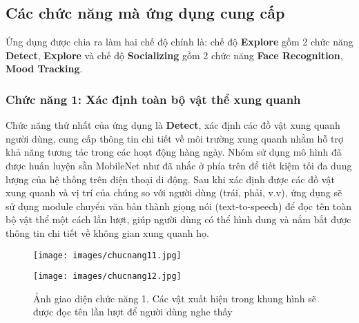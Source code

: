 \documentclass[a4paper,12pt]{article}
\begin{document}
\subsection{Các chức năng mà ứng dụng cung cấp}
Ứng dụng được chia ra làm hai chế độ chính là: chế độ \textbf{Explore} gồm 2 chức năng \textbf{Detect}, \textbf{Explore} và chế độ \textbf{Socializing} gồm 2 chức năng \textbf{Face Recognition}, \textbf{Mood Tracking}.

\subsubsection{Chức năng 1: Xác định toàn bộ vật thể xung quanh}
Chức năng thứ nhất của ứng dụng là \textbf{Detect}, xác định các đồ vật xung quanh người dùng, cung cấp thông tin chi tiết về môi trường xung quanh nhằm hỗ trợ khả năng tương tác trong các hoạt động hàng ngày. Nhóm sử dụng mô hình đã được huấn luyện sẵn MobileNet như đã nhắc ở phía trên để tiết kiệm tối đa dung lượng của hệ thống trên điện thoại di động. Sau khi xác định được các đồ vật xung quanh và vị trí của chúng so với người dùng (trái, phải, v.v), ứng dụng sẽ sử dụng module chuyển văn bản thành giọng nói (text-to-speech) để đọc tên toàn bộ vật thể một cách lần lượt, giúp người dùng có thể hình dung và nắm bắt được thông tin chi tiết về không gian xung quanh họ.
\begin{figure}[H]
    \centering
    \begin{minipage}{0.49\textwidth}
        \centering
        \texttt{[image: images/chucnang11.jpg]}
    \end{minipage}
    \hfill
    \begin{minipage}{0.49\textwidth}
        \centering
        \texttt{[image: images/chucnang12.jpg]}
        \label{fig:enter-label}
    \end{minipage}
    \caption{Ảnh giao diện chức năng 1. Các vật xuất hiện trong khung hình sẽ được đọc tên lần lượt để người dùng nghe thấy}

\end{figure}
\end{document}
